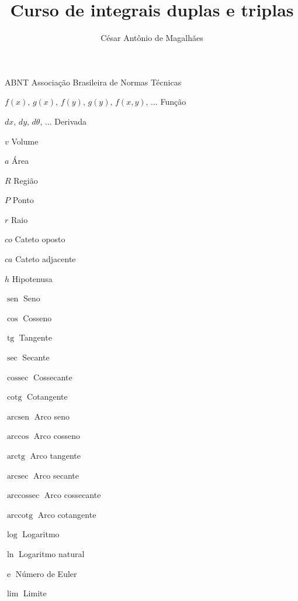 \documentclass[
	12pt,				%
	openright,			%
	twoside,			%
	a4paper,			%
	english,			%
	french,				%
	spanish,			%
	brazil,				%
]{abntex2}
\title{Curso de integrais duplas e triplas}
\author{César Antônio de Magalhães}
\DeclareMathOperator{\sen}{sen}
\DeclareMathOperator{\tg}{tg}
\DeclareMathOperator{\cossec}{cossec}
\DeclareMathOperator{\cotg}{cotg}
\DeclareMathOperator{\arcsen}{arcsen}
\DeclareMathOperator{\arctg}{arctg}
\DeclareMathOperator{\arcsec}{arcsec}
\DeclareMathOperator{\arccossec}{arccossec}
\DeclareMathOperator{\arccotg}{arccotg}
\DeclareMathOperator{\e}{e}
\begin{document}

\frenchspacing 


\imprimircapa

\imprimirfolhaderosto


\listoffigures*
\cleardoublepage

\listoftables*
\cleardoublepage

\begin{siglas}
	\item[ABNT] Associação Brasileira de Normas Técnicas
	\item[$ f(x),\, g(x),\, f(y),\, g(y),\, f(x,y),\, \textrm{...} $] Função
	\item[$ dx,\, dy,\, d\theta,\, \textrm{...} $] Derivada
	\item[$ v $] Volume
	\item[$ a $] Área
	\item[$ R $] Região
	\item[$ P $] Ponto
	\item[$ r $] Raio
	\item[$ co $] Cateto oposto
	\item[$ ca $] Cateto adjacente
	\item[$ h $] Hipotenusa
	\item[$\sen$] Seno
	\item[$ \cos $] Cosseno
	\item[$ \tg $] Tangente
	\item[$ \sec $] Secante
	\item[$ \cossec $] Cossecante
	\item[$ \cotg $] Cotangente
	\item[$ \arcsen $] Arco seno
	\item[$ \arccos $] Arco cosseno
	\item[$ \arctg $] Arco tangente
	\item[$ \arcsec $] Arco secante
	\item[$ \arccossec $] Arco cossecante
	\item[$ \arccotg $] Arco cotangente
	\item[$ \log $] Logaritmo
	\item[$ \ln $] Logaritmo natural
	\item[$ \e $] Número de Euler
	\item[$ \lim $] Limite	
\end{siglas}
\end{document}
